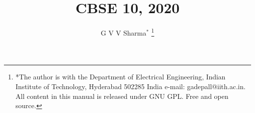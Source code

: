 \documentclass[journal,12pt,twocolumn]{IEEEtran}
\begin{document}
\let\StandardTheFigure\thefigure
\let\vec\mathbf
\renewcommand{\thefigure}{\theproblem}



\def\putbox#1#2#3{\makebox[0in][l]{\makebox[#1][l]{}\raisebox{\baselineskip}[0in][0in]{\raisebox{#2}[0in][0in]{#3}}}}
     \def\rightbox#1{\makebox[0in][r]{#1}}
     \def\centbox#1{\makebox[0in]{#1}}
     \def\topbox#1{\raisebox{-\baselineskip}[0in][0in]{#1}}
     \def\midbox#1{\raisebox{-0.5\baselineskip}[0in][0in]{#1}}

\vspace{3cm}

\title{
	CBSE 10, 2020
}
\author{ G V V Sharma$^{*}$%
	\thanks{*The author is with the Department
		of Electrical Engineering, Indian Institute of Technology, Hyderabad
		502285 India e-mail:  gadepall@iith.ac.in. All content in this manual is released under GNU GPL.  Free and open source.}
	
}	


%
%
%

% 
%
\end{document}
